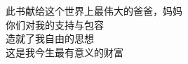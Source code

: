 \begin{dedication}
\begin{flushright}
此书献给这个世界上最伟大的爸爸，妈妈\\
你们对我的支持与包容\\
造就了我自由的思想\\
这是我今生最有意义的财富
\end{flushright}
\end{dedication}




